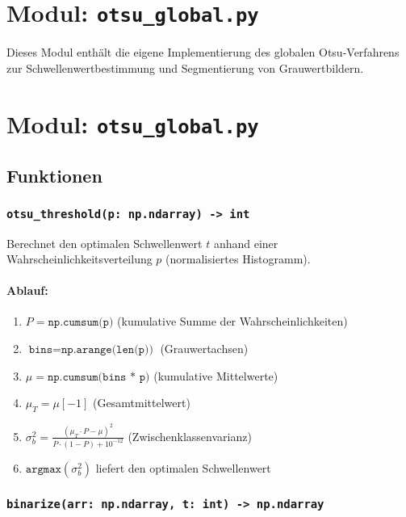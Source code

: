 \documentclass[a4paper,12pt]{article}
\begin{document}
\section{Modul: \texttt{otsu\_global.py}}

Dieses Modul enthält die eigene Implementierung des globalen Otsu-Verfahrens zur Schwellenwertbestimmung und Segmentierung von Grauwertbildern.

\section{Modul: \texttt{otsu\_global.py}}

\subsection*{Funktionen}

\subsubsection*{\texttt{otsu\_threshold(p: np.ndarray) -> int}}

Berechnet den optimalen Schwellenwert $t$ anhand einer Wahrscheinlichkeitsverteilung $p$ (normalisiertes Histogramm).

\paragraph{Ablauf:}
\begin{enumerate}
  \item $P = \texttt{np.cumsum(p)}$ \quad (kumulative Summe der Wahrscheinlichkeiten)
  \item $\texttt{bins} = \texttt{np.arange(len(p))}$ \quad (Grauwertachsen)
  \item $\mu = \texttt{np.cumsum(bins * p)}$ \quad (kumulative Mittelwerte)
  \item $\mu_T = \mu[-1]$ \quad (Gesamtmittelwert)
  \item $\sigma_b^2 = \frac{(\mu_T \cdot P - \mu)^2}{P \cdot (1 - P) + 10^{-12}}$ \quad (Zwischenklassenvarianz)
  \item $\texttt{argmax}(\sigma_b^2)$ \quad liefert den optimalen Schwellenwert
\end{enumerate}

\subsubsection*{\texttt{binarize(arr: np.ndarray, t: int) -> np.ndarray}}
\end{document}

